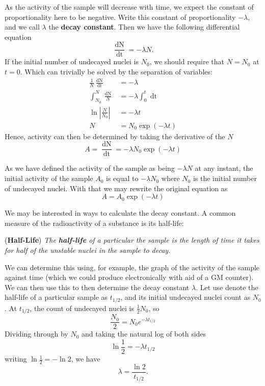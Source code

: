 As the activity of the sample will decrease with time, we expect the constant of proportionality here to be negative. Write this constant of proportionality \(-\lambda\), and we call \(\lambda\) the \textbf{decay constant}. Then we have the following differential equation 
\begin{equation}
\frac{\mathop{\mathrm{d} N}}{\mathop{\mathrm{d} t}} = -\lambda N.
\end{equation} 
If the initial number of undecayed nuclei is \(N_0\), we should require that \(N = N_0\) at \(t=0\).  Which can trivially be solved by the separation of variables: 
\begin{align} 
\frac 1 N \frac{\mathop{\mathrm{d} N}}{\mathop{\mathrm{d} t}} &= -\lambda \\ 
\int_{N_0}^N \frac {\mathop{\mathrm{d} N}} N &= -\lambda \int_0^t \mathop{\mathrm{d} t} \\ 
\ln \left | \frac{N}{N_0} \right| &= -\lambda t 
\\ N &= N_0 \exp(-\lambda t)
\end{align}
Hence, activity can then be determined by taking the derivative of the $N$ 
\begin{equation} 
A = \frac{\mathop{\mathrm{d} N}}{\mathop{\mathrm{d} t}} = -\lambda N_0 \exp(-\lambda t)
\end{equation} 

As we have defined the activity of the sample as being \(-\lambda N\) at any instant, the initial activity of the sample \(A_0\) is equal to \(-\lambda N_0\) where \(N_0\) is the initial number of undecayed nuclei. With that we may rewrite the original equation as 
\begin{equation} 
A = A_0 \exp(-\lambda t)
\end{equation} 

We may be interested in ways to calculate the decay constant. A common measure of the radioactivity of a substance is its half-life: 

\begin{definition}{(\textbf{Half-Life})}
\textit{The \textbf{half-life} of a particular the sample is the length of time it takes for half of the unstable nuclei in the sample to decay.}
\end{definition} 

We can determine this using, for example, the graph of the activity of the sample against time (which we could produce electronically with aid of a GM counter). We can then use this to then determine the decay constant \(\lambda\). Let use denote the half-life of a particular sample as \(t_{1/2}\), and its initial undecayed nuclei count as \(N_0\). At \(t_{1/2}\), the count of undecayed nuclei is \(\frac 1 2 N_0\), so
\begin{equation} 
\frac{N_0} 2 = N_0 e^{-\lambda t_{1/2}}
\end{equation} 
Dividing through by \(N_0\) and taking the natural log of both sides
\begin{equation*}
\ln \frac 1 2 = -\lambda t_{1/2}
\end{equation*} 
writing \(\ln \frac 1 2 = -\ln 2\), we have
\begin{equation} 
\lambda = \frac {\ln 2} {t_{1/2}}.
\end{equation} 

